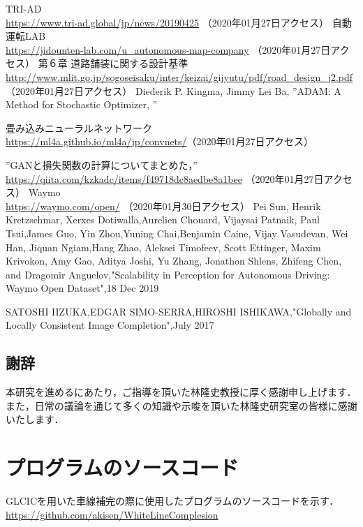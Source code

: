 \documentclass[a4j, 11pt]{jreport}
\begin{document}
\newpage
\begin{thebibliography}{1}
	TRI-AD\\ \url{https://www.tri-ad.global/jp/news/20190425} （2020年01月27日アクセス） 
	自動運転LAB\\ \url{https://jidounten-lab.com/u_autonomous-map-company} （2020年01月27日アクセス）
	第６章 道路舗装に関する設計基準\\ \url{http://www.mlit.go.jp/sogoseisaku/inter/keizai/gijyutu/pdf/road_design_j2.pdf} （2020年01月27日アクセス）
	Diederik P. Kingma, Jimmy Lei Ba, ”ADAM: A Method for Stochastic Optimizer, ”

	畳み込みニューラルネットワーク\\ \url{https://ml4a.github.io/ml4a/jp/convnets/}（2020年01月27日アクセス）

	”GANと損失関数の計算についてまとめた，” \\
	\url{https://qiita.com/kzkadc/items/f49718dc8aedbe8a1bee} （2020年01月27日アクセス）
	Waymo\\ \url{https://waymo.com/open/} （2020年01月30日アクセス）
	Pei Sun, Henrik Kretzschmar, Xerxes Dotiwalla,Aurelien Chouard, Vijaysai Patnaik, Paul Tsui,James Guo, Yin Zhou,Yuning Chai,Benjamin Caine, Vijay Vasudevan, Wei Han, Jiquan Ngiam,Hang Zhao, Aleksei Timofeev, Scott Ettinger, Maxim Krivokon, Amy Gao, Aditya Joshi, Yu	Zhang, Jonathon Shlens, Zhifeng Chen, and Dragomir Anguelov,"Scalability in Perception for Autonomous Driving: Waymo Open Dataset",18 Dec 2019
	
	SATOSHI IIZUKA,EDGAR SIMO-SERRA,HIROSHI ISHIKAWA,"Globally and Locally Consistent Image Completion",July 2017
\end{thebibliography}
\newpage





\newpage
\section*{謝辞}
本研究を進めるにあたり，ご指導を頂いた林隆史教授に厚く感謝申し上げます．
また，日常の議論を通じて多くの知識や示唆を頂いた林隆史研究室の皆様に感謝いたします．

\appendix
\chapter{プログラムのソースコード}
GLCICを用いた車線補完の際に使用したプログラムのソースコードを示す．\\
\url{https://github.com/akisen/WhiteLineComplesion}
\end{document}
